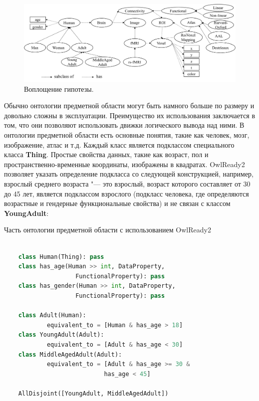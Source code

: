 \begin{figure}[ht]
    \centering
    \includegraphics[width=1.0\linewidth]{images/DomainOnto.pdf}
    \caption{Воплощение гипотезы.}\label{fig:DomainOnto}
\end{figure}

Обычно онтологии предметной области могут быть намного больше по размеру и довольно сложны в эксплуатации. Преимущество их использования заключается в том, что они позволяют использовать движки логического вывода над ними. В онтологии предметной области есть основные понятия, такие как человек, мозг, изображение, атлас и т.д. Каждый класс является подклассом специального класса \textbf{Thing}. Простые свойства данных, такие как возраст, пол и пространственно-временные координаты, изображены в квадратах. OwlReady2 позволяет указать определение подкласса со следующей конструкцией, например, взрослый среднего возраста "--- это взрослый, возраст которого составляет от 30 до 45 лет, является подклассом взрослого (подкласс человека, где определяются возрастные и гендерные функциональные свойства) и не связан с классом \textbf{YoungAdult}:

\begin{ListingEnv}[!h]%
    \captiondelim{ } %
    \caption{Часть онтологии предметной области с использованием OwlReady2}\label{lst:ontology}
    \begin{lstlisting}[language={Python}]
    
    class Human(Thing): pass
    class has_age(Human >> int, DataProperty, 
                    FunctionalProperty): pass
    class has_gender(Human >> int, DataProperty, 
                    FunctionalProperty): pass

    class Adult(Human):
            equivalent_to = [Human & has_age > 18]
    class YoungAdult(Adult):
            equivalent_to = [Adult & has_age < 30]
    class MiddleAgedAdult(Adult):
            equivalent_to = [Adult & has_age >= 30 & 
                            has_age < 45]
                            
    AllDisjoint([YoungAdult, MiddleAgedAdult])
\end{lstlisting}
\end{ListingEnv}

